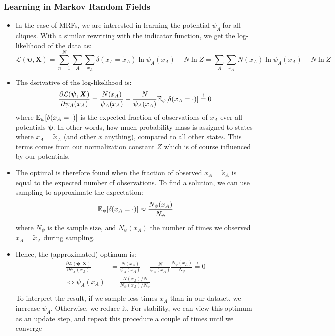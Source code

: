 \subsubsection{Learning in Markov Random Fields}
\begin{itemize}
	\item In the case of MRFs, we are interested in learning the potential $\psi_A$ for all cliques. With a similar rewriting with the indicator function, we get the log-likelihood of the data as:
	$$\mathcal{L}(\bm{\psi}, \bm{X}) = \sum_{n=1}^{N} \sum_A \sum_{x_A} \delta(x_A=\tilde{x}_A)\ln \psi_A(x_A) - N\ln Z = \sum_A \sum_{x_A} N(x_A)\ln \psi_A(x_A) - N\ln Z$$
	\item The derivative of the log-likelihood is:
	\begin{equation*}
		\begin{split}
			\frac{\partial \mathcal{L}(\bm{\psi}, \bm{X})}{\partial \psi_A(x_A)} = \frac{N(x_A)}{\psi_A(x_A)} - \frac{N}{\psi_A(x_A)}\mathbb{E}_{\psi}[\delta(x_A=\cdot)] \overset{!}{=} 0
		\end{split}
	\end{equation*}
	where $\mathbb{E}_{\psi}[\delta(x_A=\cdot)]$ is the expected fraction of observations of $x_A$ over all potentials $\bm{\psi}$. In other words, how much probability mass is assigned to states where $x_A=\tilde{x}_A$ (and other $x$ anything), compared to all other states. This terms comes from our normalization constant $Z$ which is of course influenced by our potentials.
	\item The optimal is therefore found when the fraction of observed $x_A=\tilde{x}_A$ is equal to the expected number of observations. To find a solution, we can use sampling to approximate the expectation:
	$$\mathbb{E}_{\psi}[\delta(x_A=\cdot)] \approx \frac{N_{\psi}(x_A)}{N_{\psi}}$$
	where $N_{\psi}$ is the sample size, and $N_{\psi}(x_A)$ the number of times we observed $x_A=\tilde{x}_A$ during sampling.
	\item Hence, the (approximated) optimum is:
	\begin{equation*}
		\begin{split}
			\frac{\partial \mathcal{L}(\bm{\psi}, \bm{X})}{\partial \psi_A(x_A)} & = \frac{N(x_A)}{\psi_A(x_A)} - \frac{N}{\psi_A(x_A)}  \frac{N_{\psi}(x_A)}{N_{\psi}}\overset{!}{=} 0\\
			\Leftrightarrow \psi_A(x_A) & = \frac{N(x_A)/N}{N_{\psi}(x_A)/N_{\psi}}\\
		\end{split}
	\end{equation*}
	To interpret the result, if we sample less times $x_A$ than in our dataset, we increase $\psi_A$. Otherwise, we reduce it. For stability, we can view this optimum as an update step, and repeat this procedure a couple of times until we converge 
\end{itemize}

